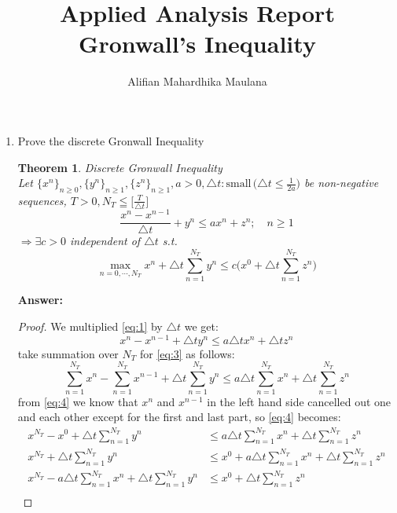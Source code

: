 \documentclass[a4paper,12pt]{article}
\title{Applied Analysis Report \\ Gronwall's Inequality}
\author{Alifian Mahardhika Maulana}
\newtheorem{theorem}{Theorem}
\begin{document}
\maketitle
\begin{enumerate}
	\item Prove the discrete Gronwall Inequality
		\begin{theorem} Discrete Gronwall Inequality\\
			Let $\{x^n\}_{n\geq 0},\{y^n\}_{n\geq 1},\{z^n\}_{n\geq 1},a>0,\triangle t: \text{small}\,\big( \triangle t \leq \frac{1}{2a} \big)$ be non-negative sequences, $T>0, N_T\leqq \big[ \frac{T}{\triangle t} \big]$
			\begin{equation}\label{eq:1}
			\frac{x^n - x^{n-1}}{\triangle t} + y^n \leq ax^n + z^n; \quad n\geq 1
			\end{equation}
			$\Rightarrow \exists c > 0$ independent of $\triangle t$ s.t.
			\begin{equation}\label{eq:2}
			\max_{n=0,\cdots,N_T} x^n + \triangle t \sum_{n=1}^{N_T}y^n \leq c\bigg(x^0 + \triangle t \sum_{n=1}^{N_T} z^n\bigg)
			\end{equation}
		\end{theorem}
	\textbf{Answer:}
	\begin{proof}
		We multiplied \eqref{eq:1} by $\triangle t$ we get:
		\begin{equation}\label{eq:3}
		x^n - x^{n-1}+ \triangle t y^n \leq a \triangle t x^n + \triangle t z^n
		\end{equation}
		take summation over $N_T$ for \eqref{eq:3} as follows:
		\begin{equation}\label{eq:4}
		\sum_{n=1}^{N_T}x^n - \sum_{n=1}^{N_T}x^{n-1}+ \triangle t \sum_{n=1}^{N_T}y^n \leq a \triangle t \sum_{n=1}^{N_T}x^n + \triangle t \sum_{n=1}^{N_T}z^n
		\end{equation}
		from \eqref{eq:4} we know that $x^n$ and $x^{n-1}$ in the left hand side cancelled out one and each other except for the first and last part, so \eqref{eq:4} becomes:
		\begin{equation}\label{eq:5}
		\begin{aligned}
		x^{N_T} -x^0 + \triangle t \sum_{n=1}^{N_T}y^n &\leq a \triangle t \sum_{n=1}^{N_T}x^n + \triangle t \sum_{n=1}^{N_T}z^n\\
		x^{N_T} + \triangle t \sum_{n=1}^{N_T}y^n &\leq x^0 + a \triangle t \sum_{n=1}^{N_T}x^n + \triangle t \sum_{n=1}^{N_T}z^n\\
		x^{N_T} - a \triangle t \sum_{n=1}^{N_T}x^n + \triangle t \sum_{n=1}^{N_T}y^n &\leq x^0 + \triangle t \sum_{n=1}^{N_T}z^n\\

\end{aligned}
\end{equation}
\end{proof}
\end{enumerate}
\end{document}
